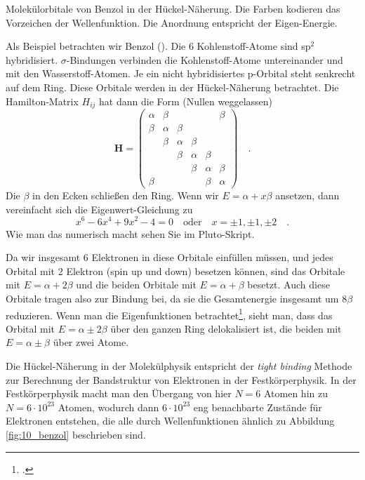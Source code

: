 \begin{marginfigure}[20mm]
\caption{Molekülorbitale von Benzol in der Hückel-Näherung. Die Farben kodieren das Vorzeichen der Wellenfunktion. Die Anordnung entspricht der Eigen-Energie.\label{fig:10_benzol}}
\end{marginfigure}

Als Beispiel betrachten wir Benzol (). Die 6 Kohlenstoff-Atome sind sp$^2$ hybridisiert. $\sigma$-Bindungen verbinden die Kohlenstoff-Atome untereinander und mit den Wasserstoff-Atomen. Je ein nicht hybridisiertes p-Orbital steht senkrecht auf dem Ring. Diese Orbitale werden in der Hückel-Näherung betrachtet. Die Hamilton-Matrix $H_{ij}$ hat dann die Form (Nullen weggelassen)
\begin{equation}
\mathbf{H} = 
 \begin{pmatrix}
  \alpha  & \beta &  &  &  & \beta \\
  \beta & \alpha  & \beta & & & \\
  & \beta & \alpha  & \beta & & \\
 &  & \beta & \alpha & \beta & \\
&  &  & \beta & \alpha & \beta \\
\beta & &  &  & \beta & \alpha 
 \end{pmatrix}  \quad .
\end{equation}
Die $\beta$ in den Ecken schließen den Ring.
Wenn wir $E = \alpha + x \beta$ ansetzen, dann vereinfacht sich die Eigenwert-Gleichung zu 
\begin{equation}
x^6 - 6 x^4 + 9x^2 - 4 = 0 \quad \text{oder} \quad x = \pm 1, \pm 1, \pm 2 \quad .
\end{equation}
Wie man das numerisch macht sehen Sie im   Pluto-Skript.



Da wir insgesamt 6 Elektronen in diese Orbitale einfüllen müssen, und jedes Orbital mit 2 Elektron (spin up und down) besetzen können, sind das Orbitale mit $E=\alpha + 2 \beta$ und die beiden Orbitale mit $E = \alpha + \beta$ besetzt. Auch diese Orbitale tragen also zur Bindung bei, da sie die Gesamtenergie insgesamt um $8\beta$ reduzieren. Wenn man die Eigenfunktionen betrachtet\footcite{Atkins}, sieht man, dass  das Orbital mit $E=\alpha \pm 2 \beta$  über den ganzen Ring delokalisiert ist, die beiden mit $E = \alpha \pm \beta$  über zwei  Atome.


Die Hückel-Näherung in der Molekülphysik entspricht der \emph{tight binding} Methode zur Berechnung der Bandstruktur von Elektronen  in der Festkörperphysik. In der Festkörperphysik macht man den Übergang von hier $N=6$ Atomen hin zu $N= 6 \cdot 10^{23}$ Atomen, wodurch dann  $6 \cdot 10^{23}$ eng benachbarte Zustände für Elektronen entstehen, die alle durch Wellenfunktionen ähnlich zu Abbildung \ref{fig:10_benzol} beschrieben sind.

